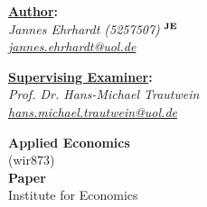 \documentclass[a4paper, 12pt, twoside, english]{article}
\begin{document}
\begin{titlepage}
            




\begin{center}
    \begin{minipage}[t]{0.45\textwidth}
        \begin{flushleft}
            \textbf{\underline{Author}:} \\
            \textit{Jannes Ehrhardt (5257507)$^{\text{ \textbf{JE}}}$} \\
            \textit{\href{mailto:jannes.ehrhardt@uni-oldenburg.de}{jannes.ehrhardt@uol.de}}
        \end{flushleft}
    \end{minipage}%
    \hspace{0.1\textwidth}%
    \begin{minipage}[t]{0.45\textwidth}
        \begin{flushright}
            \textbf{\underline{Supervising Examiner}:} \\
            \textit{Prof. Dr. Hans-Michael Trautwein} \\
            \textit{\href{mailto:hans.michael.trautwein@uni-oldenburg.de}{hans.michael.trautwein@uol.de}} \\
        \end{flushright}
    \end{minipage}
    \vspace*{1\baselineskip}
\end{center}








	\begin{center}













    
	\rmfamily\scshape   
	   
	   
	   
	\textbf{\Large{Applied Economics}} \\ 
    (wir873) \\
    \vspace{.4cm}
	\textbf{Paper} \\
    \vspace{.4cm}
	Institute for Economics \\
	
	   
	\vspace*{2.0\baselineskip} %
	

\end{center}
\end{titlepage}
\end{document}
